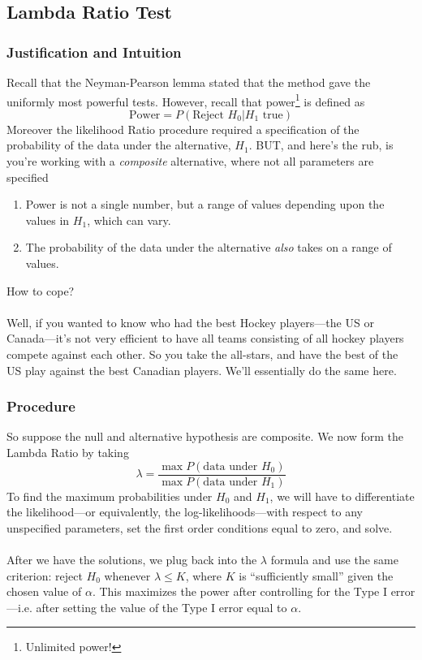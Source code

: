 \documentclass[12pt]{article}
\theoremstyle{plain}
\theoremstyle{definition}
\theoremstyle{remark}
\begin{document}
\subsection{Lambda Ratio Test}

\subsubsection{Justification and Intuition}

Recall that the Neyman-Pearson lemma stated that the method gave
the uniformly most powerful tests. However, recall that power\footnote{
Unlimited power!} is defined as
   \[ \text{Power} = P(\text{Reject $H_0$} | \text{$H_1$ true}) \]
Moreover the likelihood Ratio procedure required a specification
of the probability of the data under the alternative, $H_1$. BUT,
and here's the rub, is you're working with a \emph{composite}
alternative, where not all parameters are specified
\begin{enumerate}
   \item Power is not a single number, but a range of values
      depending upon the values in $H_1$, which can vary.
   \item The probability of the data under the alternative \emph{also}
      takes on a range of values.
\end{enumerate}
How to cope?
\\
\\
Well, if you wanted to know who had the best Hockey players---the US
or Canada---it's not very efficient to have all teams consisting of
all hockey players compete against each other. So you take the
all-stars, and have the best of the US play against the best Canadian
players.  We'll essentially do the same here.

\subsubsection{Procedure}

So suppose the null and alternative hypothesis are composite.
We now form the Lambda Ratio by taking
\[ \lambda =
   \frac{\max P(\text{data under $H_0$})}{
      \max P(\text{data under $H_1$})}
   \]
To find the maximum probabilities under $H_0$ and $H_1$, we
will have to differentiate the likelihood---or equivalently, the
log-likelihoods---with respect to any unspecified parameters, set
the first order conditions equal to zero, and solve.
\\
\\
After we have the solutions, we plug back into the $\lambda$ formula
and use the same criterion:
reject $H_0$ whenever $\lambda\leq K$,
where $K$ is ``sufficiently small'' given the chosen value of $\alpha$.
This maximizes the power after controlling for the Type I error---i.e.
after setting the value of the Type I error equal to $\alpha$.
\end{document}
